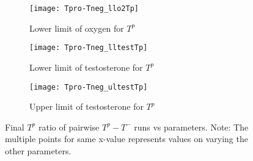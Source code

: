 \begin{figure}[h!]
  \centering
  \begin{subfigure}[b]{0.45\textwidth}
    \centering
    \texttt{[image: Tpro-Tneg\_llo2Tp]}
    \caption{Lower limit of oxygen for $T^p$}
    \label{fig_Tpro-Tneg_llo2Tp}
  \end{subfigure}
  \begin{subfigure}[b]{0.45\textwidth}
    \centering
    \texttt{[image: Tpro-Tneg\_lltestTp]}
    \caption{Lower limit of testosterone for $T^p$}
    \label{fig_Tpro-Tneg_lltestTp}
  \end{subfigure}
  \begin{subfigure}[b]{0.45\textwidth}
    \centering
    \texttt{[image: Tpro-Tneg\_ultestTp]}
    \caption{Upper limit of testosterone for $T^p$}
    \label{fig_Tpro-Tneg_ultestTp}
  \end{subfigure}
  \caption[Final $T^p$ ratio of pairwise $T^p - T^-$ runs vs parameters]{Final $T^p$ ratio of pairwise $T^p - T^-$ runs vs parameters. Note: The multiple points for same x-value represents values on varying the other parameters.}
  \label{fig_Tpro-Tneg_megarun}
\end{figure}


